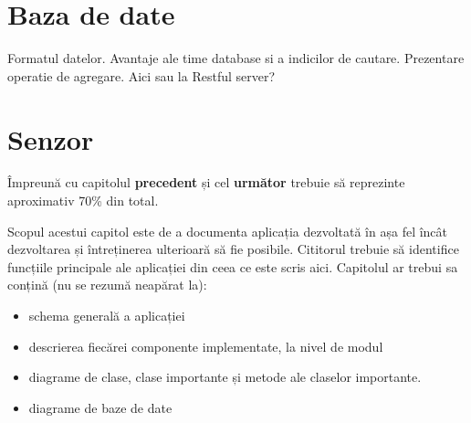 \section{Baza de date}\label{sec:pi_bazadedate}
Formatul datelor.
Avantaje ale time database si a indicilor de cautare.
Prezentare operatie de agregare. Aici sau la Restful server?

\section{Senzor}\label{sec:pi_senzor}


{\color{blue}Împreună cu capitolul \textbf{precedent} și cel \textbf{următor} trebuie să reprezinte aproximativ 70\% din total.\\}

Scopul acestui capitol este de a documenta aplicația dezvoltată în așa fel încât dezvoltarea și întreținerea ulterioară să fie posibile.
Cititorul trebuie să identifice funcțiile principale ale aplicației din ceea ce este scris aici.
Capitolul ar trebui sa conțină (nu se rezumă neapărat la):
\begin{itemize}
	\item schema generală a aplicației
	\item descrierea fiecărei componente implementate, la nivel de modul
	\item diagrame de clase, clase importante și metode ale claselor importante.
    \item diagrame de baze de date
\end{itemize}
